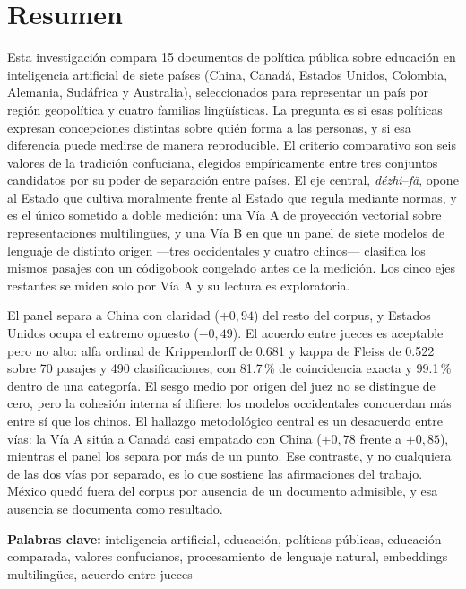 \chapter*{Resumen}

Esta investigación compara 15 documentos de política pública sobre educación en inteligencia artificial de siete países (China, Canadá, Estados Unidos, Colombia, Alemania, Sudáfrica y Australia), seleccionados para representar un país por región geopolítica y cuatro familias lingüísticas. La pregunta es si esas políticas expresan concepciones distintas sobre quién forma a las personas, y si esa diferencia puede medirse de manera reproducible. El criterio comparativo son seis valores de la tradición confuciana, elegidos empíricamente entre tres conjuntos candidatos por su poder de separación entre países. El eje central, \emph{dézhì}--\emph{fǎ}, opone al Estado que cultiva moralmente frente al Estado que regula mediante normas, y es el único sometido a doble medición: una Vía A de proyección vectorial sobre representaciones multilingües, y una Vía B en que un panel de siete modelos de lenguaje de distinto origen ---tres occidentales y cuatro chinos--- clasifica los mismos pasajes con un códigobook congelado antes de la medición. Los cinco ejes restantes se miden solo por Vía A y su lectura es exploratoria.

El panel separa a China con claridad ($+0{,}94$) del resto del corpus, y Estados Unidos ocupa el extremo opuesto ($-0{,}49$). El acuerdo entre jueces es aceptable pero no alto: alfa ordinal de Krippendorff de 0.681 y kappa de Fleiss de 0.522 sobre 70 pasajes y 490 clasificaciones, con 81.7\,\% de coincidencia exacta y 99.1\,\% dentro de una categoría. El sesgo medio por origen del juez no se distingue de cero, pero la cohesión interna sí difiere: los modelos occidentales concuerdan más entre sí que los chinos. El hallazgo metodológico central es un desacuerdo entre vías: la Vía A sitúa a Canadá casi empatado con China ($+0{,}78$ frente a $+0{,}85$), mientras el panel los separa por más de un punto. Ese contraste, y no cualquiera de las dos vías por separado, es lo que sostiene las afirmaciones del trabajo. México quedó fuera del corpus por ausencia de un documento admisible, y esa ausencia se documenta como resultado.

\textbf{Palabras clave:} inteligencia artificial, educación, políticas públicas, educación comparada, valores confucianos, procesamiento de lenguaje natural, embeddings multilingües, acuerdo entre jueces

